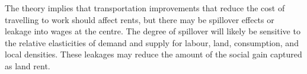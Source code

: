 The theory implies that transportation improvements that reduce the cost of travelling to work should affect rents, but there may be spillover effects or leakage into wages  at the centre. %
The degree of spillover will likely be sensitive to the relative elasticities of demand and supply  for labour, land, consumption, and local densities. These leakages may reduce the amount of the social gain captured as land rent. %

